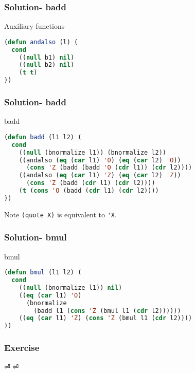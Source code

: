 \documentclass[fleqn]{beamer}
\begin{document}
\begin{frame}[fragile]
  \frametitle{Solution- badd}
  \begin{block}{Auxiliary functions}
    \begin{lstlisting}[language=Lisp]
(defun andalso (l) (
  cond
    ((null b1) nil)
    ((null b2) nil)
    (t t)
))
    \end{lstlisting}
  \end{block}
\end{frame}

\begin{frame}[fragile]
  \frametitle{Solution- badd}
  \begin{block}{badd}
    \begin{lstlisting}[language=Lisp]
(defun badd (l1 l2) (
  cond
    ((null (bnormalize l1)) (bnormalize l2))
    ((andalso (eq (car l1) 'O) (eq (car l2) 'O))
      (cons 'Z (badd (badd 'O (cdr l1)) (cdr l2))))
    ((andalso (eq (car l1) 'Z) (eq (car l2) 'Z))
      (cons 'Z (badd (cdr l1) (cdr l2))))
    (t (cons 'O (badd (cdr l1) (cdr l2))))
))
    \end{lstlisting}
  \end{block}

  \begin{block}{Note}
    \Verb |(quote X)| is equivalent to \Verb |'X|.
  \end{block}
\end{frame}

\begin{frame}[fragile]
  \frametitle{Solution- bmul}
  \begin{block}{bmul}
    \begin{lstlisting}[language=Lisp]
(defun bmul (l1 l2) (
  cond
    ((null (bnormalize l1)) nil)
    ((eq (car l1) 'O)
      (bnormalize
        (badd l1 (cons 'Z (bmul l1 (cdr l2))))))
    ((eq (car l1) 'Z) (cons 'Z (bmul l1 (cdr l2))))
))
    \end{lstlisting}
  \end{block}
\end{frame}

\begin{frame}
  \frametitle{Exercise}
  ⏎
  ⏎
\end{frame}
\end{document}
